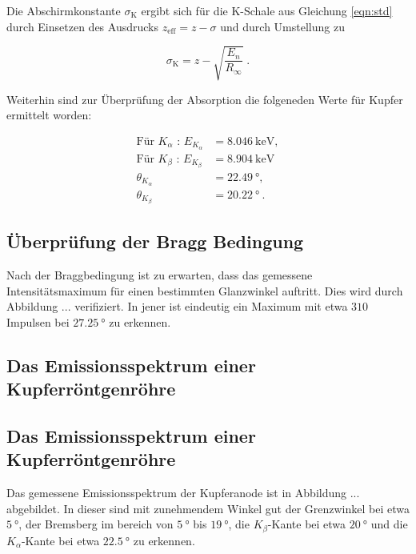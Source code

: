   Die Abschirmkonstante $\sigma_\text{K}$ ergibt sich für die K-Schale aus Gleichung
  \eqref{eqn:std} durch Einsetzen des Ausdrucks $z_\text{eff} = z -\sigma$ und durch 
  Umstellung zu 

  \begin{equation}
    \sigma_\text{K} = z - \sqrt{\frac{E_n}{R_{\infty}}} \; .
    \label{eqn:sigma}
  \end{equation}

  Weiterhin sind zur Überprüfung der Absorption die folgeneden Werte für Kupfer 
  ermittelt worden:

  \begin{align*}
    \text{Für } K_\alpha \text{ : } E_{K_\alpha} &= \SI{8.046}{\kilo\eV}, \\
    \text{Für } K_\beta \text{ : } E_{K_\beta} &= \SI{8.904}{\kilo\eV} \\
    \theta_{K_\alpha} &= \SI{22.49}{\degree}, \\
    \theta_{K_\beta} &= \SI{20.22}{\degree} \: .
 \end{align*}









\subsection{Überprüfung der Bragg Bedingung}

Nach der Braggbedingung ist zu erwarten, dass das gemessene Intensitätsmaximum
für einen bestimmten Glanzwinkel auftritt. 
Dies wird durch Abbildung ... verifiziert. In jener ist eindeutig ein Maximum 
mit etwa $310$ Impulsen bei $\SI{27.25}{\degree}$ zu erkennen.

\subsection{Das Emissionsspektrum einer Kupferröntgenröhre}

\subsection{Das Emissionsspektrum einer Kupferröntgenröhre}

Das gemessene Emissionsspektrum der Kupferanode ist in Abbildung ... abgebildet.
In dieser sind mit zunehmendem Winkel gut der Grenzwinkel bei etwa $\SI{5}{\degree}$,
der Bremsberg im bereich von $\SI{5}{\degree}$ bis $\SI{19}{\degree}$, die 
$K_\beta$-Kante bei etwa $\SI{20}{\degree}$ und die $K_\alpha$-Kante bei 
etwa $\SI{22.5}{\degree}$ zu erkennen. 

